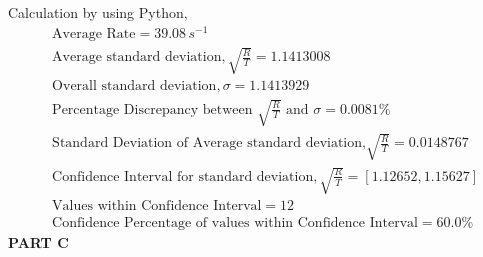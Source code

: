 \documentclass[a4paper,11pt]{article}
\begin{document}
\noindent Calculation by using Python,
\begin{align*}
&\text{Average Rate} = 39.08 \,s^{-1}\\
&\text{Average standard deviation},\sqrt{\frac{R}{T}} = 1.1413008 \\
&\text{Overall standard deviation},\sigma = 1.1413929 \\
&\text{Percentage Discrepancy between $\sqrt{\frac{R}{T}}$ and $\sigma$} = 0.0081\% \\
&\text{Standard Deviation of Average standard deviation,$\sqrt{\frac{R}{T}}$} = 0.0148767 \\
&\text{Confidence Interval for standard deviation},\sqrt{\frac{R}{T}} = [1.12652, 1.15627] \\
&\text{Values within Confidence Interval} = 12 \\
&\text{Confidence Percentage of values within Confidence Interval} = 60.0\%
\end{align*}
\newpage
\noindent \textbf{PART C}
\\
\end{document}
